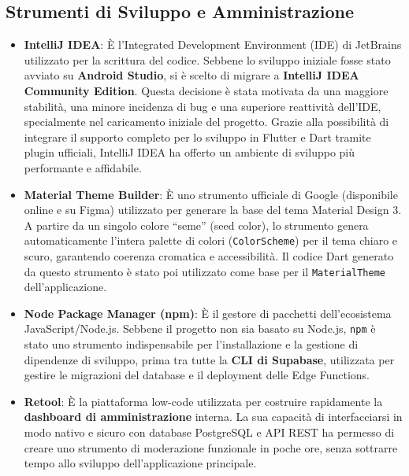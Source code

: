 \subsection{Strumenti di Sviluppo e Amministrazione}\label{subsec:strumenti-di-sviluppo-e-amministrazione}
\begin{itemize}
	\item \textbf{IntelliJ IDEA}: È l'Integrated Development Environment (IDE) di JetBrains utilizzato per la scrittura del codice.
	Sebbene lo sviluppo iniziale fosse stato avviato su \textbf{Android Studio}, si è scelto di migrare a \textbf{IntelliJ IDEA Community Edition}.
	Questa decisione è stata motivata da una maggiore stabilità, una minore incidenza di bug e una superiore reattività dell'IDE, specialmente nel caricamento iniziale del progetto.
	Grazie alla possibilità di integrare il supporto completo per lo sviluppo in Flutter e Dart tramite plugin ufficiali, IntelliJ IDEA ha offerto un ambiente di sviluppo più performante e affidabile.
	
	\item \textbf{Material Theme Builder}: È uno strumento ufficiale di Google (disponibile online e su Figma) utilizzato per generare la base del tema Material Design 3.
	A partire da un singolo colore ``seme'' (seed color), lo strumento genera automaticamente l'intera palette di colori (\texttt{ColorScheme}) per il tema chiaro e scuro, garantendo coerenza cromatica e accessibilità.
	Il codice Dart generato da questo strumento è stato poi utilizzato come base per il \texttt{MaterialTheme} dell'applicazione.
	
	\item \textbf{Node Package Manager (npm)}: È il gestore di pacchetti dell'ecosistema JavaScript/Node.js.
	Sebbene il progetto non sia basato su Node.js, \texttt{npm} è stato uno strumento indispensabile per l'installazione e la gestione di dipendenze di sviluppo, prima tra tutte la \textbf{CLI di Supabase}, utilizzata per gestire le migrazioni del database e il deployment delle Edge Functions.
	
	\item \textbf{Retool}: È la piattaforma low-code utilizzata per costruire rapidamente la \textbf{dashboard di amministrazione} interna.
	La sua capacità di interfacciarsi in modo nativo e sicuro con database PostgreSQL e API REST ha permesso di creare uno strumento di moderazione funzionale in poche ore, senza sottrarre tempo allo sviluppo dell'applicazione principale.
\end{itemize}

